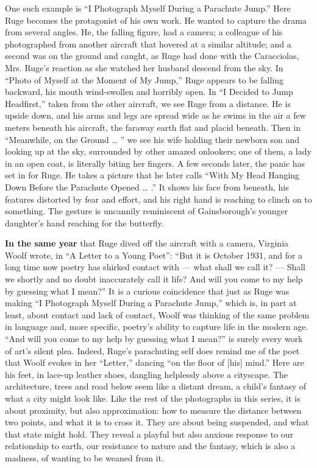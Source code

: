 One such example is ``I Photograph Myself During a Parachute Jump.''
Here Ruge becomes the protagonist of his own work. He wanted to capture
the drama from several angles. He, the falling figure, had a camera; a
colleague of his photographed from another aircraft that hovered at a
similar altitude; and a second was on the ground and caught, as Ruge had
done with the Caracciolas, Mrs. Ruge's reaction as she watched her
husband descend from the sky. In ``Photo of Myself at the Moment of My
Jump,'' Ruge appears to be falling backward, his mouth wind-swollen and
horribly open. In ``I Decided to Jump Headfirst,'' taken from the other
aircraft, we see Ruge from a distance. He is upside down, and his arms
and legs are spread wide as he swims in the air a few meters beneath his
aircraft, the faraway earth flat and placid beneath. Then in
``Meanwhile, on the Ground \ldots{} '' we see his wife holding their
newborn son and looking up at the sky, surrounded by other amazed
onlookers; one of them, a lady in an open coat, is literally biting her
fingers. A few seconds later, the panic has set in for Ruge. He takes a
picture that he later calls ``With My Head Hanging Down Before the
Parachute Opened \ldots{} .'' It shows his face from beneath, his
features distorted by fear and effort, and his right hand is reaching to
clinch on to something. The gesture is uncannily reminiscent of
Gainsborough's younger daughter's hand reaching for the butterfly.

\textbf{In the same year} that Ruge dived off the aircraft with a
camera, Virginia Woolf wrote, in ``A Letter to a Young Poet'': ``But it
is October 1931, and for a long time now poetry has shirked contact with
--- what shall we call it? --- Shall we shortly and no doubt
inaccurately call it life? And will you come to my help by guessing what
I mean?'' It is a curious coincidence that just as Ruge was making ``I
Photograph Myself During a Parachute Jump,'' which is, in part at least,
about contact and lack of contact, Woolf was thinking of the same
problem in language and, more specific, poetry's ability to capture life
in the modern age. ``And will you come to my help by guessing what I
mean?'' is surely every work of art's silent plea. Indeed, Ruge's
parachuting self does remind me of the poet that Woolf evokes in her
``Letter,'' dancing ``on the floor of {[}his{]} mind.'' Here are his
feet, in lace-up leather shoes, dangling helplessly above a cityscape.
The architecture, trees and road below seem like a distant dream, a
child's fantasy of what a city might look like. Like the rest of the
photographs in this series, it is about proximity, but also
approximation: how to measure the distance between two points, and what
it is to cross it. They are about being suspended, and what that state
might hold. They reveal a playful but also anxious response to our
relationship to earth, our resistance to nature and the fantasy, which
is also a madness, of wanting to be weaned from it.

